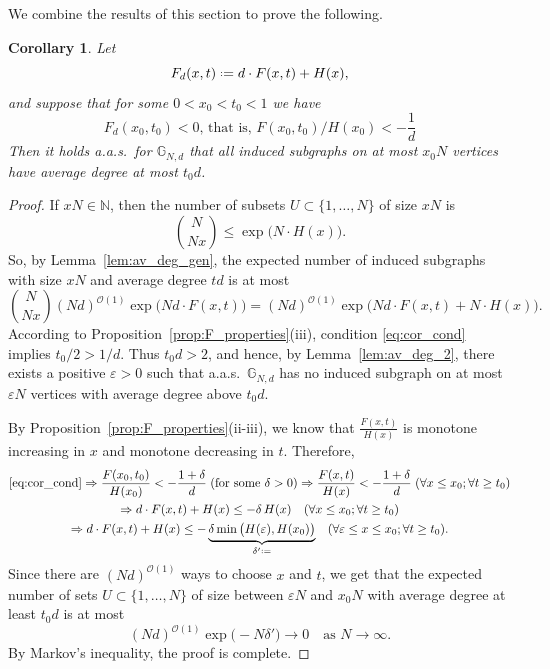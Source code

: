 \documentclass[12pt]{amsart}
\newtheorem{corollary}[theorem]{Corollary}
\theoremstyle{definition}
\newcommand\Nb{\mathbb{N}}
\newcommand\Gb{\mathbb{G}}
\newcommand\Oc{\mathcal{O}}  %
\newcommand\de{\delta}
\newcommand\eps{\varepsilon}
\newcommand{\defeq}{\mathrel{\vcenter{\baselineskip0.5ex \lineskiplimit0pt
                     \hbox{\scriptsize.}\hbox{\scriptsize.}}}%
                     =}
\begin{document}
We combine the results of this section to prove the following.
%
\begin{corollary} \label{cor:all_subgraphs}
Let
%
\begin{equation} \label{eq:Fd_def}
F_d(x,t) \defeq d \cdot F(x,t) + H(x) ,
\end{equation}
%
and suppose that for some $0<x_0<t_0<1$ we have
%
\begin{equation} \label{eq:cor_cond}
F_d(x_0,t_0) < 0 
\text{, that is, }
F(x_0,t_0) \big/ H(x_0) < -\frac{1}{d}
\end{equation}
%
Then it holds a.a.s.~for $\Gb_{N,d}$ that all induced subgraphs on at most $x_0 N$ vertices have average degree at most $t_0 d$.
\end{corollary}
%
\begin{proof}
If $xN \in \Nb$, then the number of subsets $U\subset \{1,\ldots,N\}$ of size $xN$ is
%
\[ \binom{N}{Nx} \leq \exp\bigg( N \cdot H(x) \bigg) .\]
%
So, by Lemma~\ref{lem:av_deg_gen}, the expected number of induced subgraphs with size $xN$ and average degree $td$ is at most
%
\[ \binom{N}{Nx} (Nd)^{\Oc(1)} \exp\bigg( Nd \cdot F(x,t) \bigg) = (Nd)^{\Oc(1)} \exp\bigg( Nd \cdot F(x,t) + N \cdot H(x) \bigg) .\]
%
%
According to Proposition~\ref{prop:F_properties}(iii), condition \eqref{eq:cor_cond} implies $t_0/2>1/d$. Thus $t_0 d>2$, and hence, by Lemma~\ref{lem:av_deg_2}, there exists a positive $\eps>0$ such that a.a.s.~$\Gb_{N,d}$ has no induced subgraph on at most $\eps N$ vertices with average degree above $t_0 d$.

By Proposition~\ref{prop:F_properties}(ii-iii), we know that $\frac{F(x,t)}{H(x)}$ is monotone increasing in $x$ and monotone decreasing in $t$. Therefore, 
%
\begin{multline*}
\eqref{eq:cor_cond} \Rightarrow 
\frac{F(x_0,t_0)}{H(x_0)} < - \frac{1+\de}{d}  
\;\text{(for some $\de>0$)} 
\Rightarrow
\frac{F(x,t)}{H(x)} < - \frac{1+\de}{d} \; (\forall x \leq x_0; \forall t \geq t_0) \\
\Rightarrow
d \cdot F(x,t) + H(x) \leq - \de \, H(x)  \quad (\forall x \leq x_0; \forall t \geq t_0) \\
\Rightarrow
d \cdot F(x,t) + H(x) \leq - \underbrace{\de \min\big( H(\eps), H(x_0) \big)}_{\de' \defeq}  \quad (\forall \eps \leq x \leq x_0; \forall t \geq t_0) .
\end{multline*}
%
Since there are $(Nd)^{\Oc(1)}$ ways to choose $x$ and $t$, we get that the expected number of sets $U \subset \{1,\ldots,N\}$ of size between $\eps N$ and $x_0 N$ with average degree at least $t_0 d$ is at most 
%
\[ (Nd)^{\Oc(1)} \exp\big( -N \de' \big) \to 0 
\quad \text{as } N \to \infty .\]
%
By Markov's inequality, the proof is complete.
\end{proof}
\end{document}
